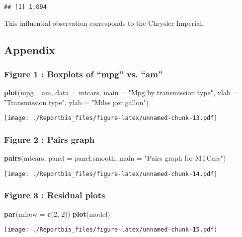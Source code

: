 \documentclass[a3paper]{article}
\newenvironment{Shaded}{\begin{snugshade}}{\end{snugshade}}
\newcommand{\KeywordTok}[1]{\textcolor[rgb]{0.13,0.29,0.53}{\textbf{{#1}}}}
\newcommand{\DataTypeTok}[1]{\textcolor[rgb]{0.13,0.29,0.53}{{#1}}}
\newcommand{\DecValTok}[1]{\textcolor[rgb]{0.00,0.00,0.81}{{#1}}}
\newcommand{\StringTok}[1]{\textcolor[rgb]{0.31,0.60,0.02}{{#1}}}
\newcommand{\NormalTok}[1]{{#1}}
\begin{document}
\begin{verbatim}
## [1] 1.094
\end{verbatim}

This influential observation corresponds to the Chrysler Imperial.

\subsection{Appendix}\label{appendix}

\subsubsection{Figure 1 : Boxplots of ``mpg'' vs.
``am''}\label{figure-1-boxplots-of-mpg-vs.-am}

\begin{Shaded}
\begin{Highlighting}[]
\KeywordTok{plot}\NormalTok{(mpg ~}\StringTok{ }\NormalTok{am, }\DataTypeTok{data =} \NormalTok{mtcars, }\DataTypeTok{main =} \StringTok{"Mpg by transmission type"}\NormalTok{, }\DataTypeTok{xlab =} \StringTok{"Transmission type"}\NormalTok{, }\DataTypeTok{ylab =} \StringTok{"Miles per gallon"}\NormalTok{)}
\end{Highlighting}
\end{Shaded}

\texttt{[image: ./Reportbis\_files/figure-latex/unnamed-chunk-13.pdf]}

\subsubsection{Figure 2 : Pairs graph}\label{figure-2-pairs-graph}

\begin{Shaded}
\begin{Highlighting}[]
\KeywordTok{pairs}\NormalTok{(mtcars, }\DataTypeTok{panel =} \NormalTok{panel.smooth, }\DataTypeTok{main =} \StringTok{"Pairs graph for MTCars"}\NormalTok{)}
\end{Highlighting}
\end{Shaded}

\texttt{[image: ./Reportbis\_files/figure-latex/unnamed-chunk-14.pdf]}

\subsubsection{Figure 3 : Residual plots}\label{figure-3-residual-plots}

\begin{Shaded}
\begin{Highlighting}[]
\KeywordTok{par}\NormalTok{(}\DataTypeTok{mfrow =} \KeywordTok{c}\NormalTok{(}\DecValTok{2}\NormalTok{, }\DecValTok{2}\NormalTok{))}
\KeywordTok{plot}\NormalTok{(model)}
\end{Highlighting}
\end{Shaded}

\texttt{[image: ./Reportbis\_files/figure-latex/unnamed-chunk-15.pdf]}
\end{document}
